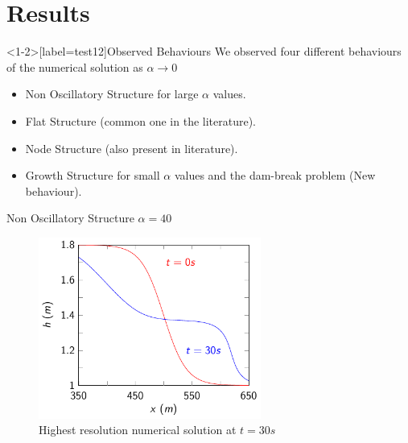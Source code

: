 \documentclass[pdf]{beamer}
\begin{document}
\section{Results}
\begin{frame}<1-2>[label=test12]{Observed Behaviours}
	We observed four different behaviours of the numerical solution as $\alpha \rightarrow 0 $
	\pause
	\begin{itemize}
		\item Non Oscillatory Structure for large $\alpha$ values.
		\pause 
		\item Flat Structure (common one in the literature).
		\pause
		\item Node Structure (also present in literature).	
		\pause	
		\item Growth Structure for small $\alpha$ values and the dam-break problem (New behaviour).
	\end{itemize}
\end{frame}

\begin{frame}{Non Oscillatory Structure $\alpha = 40$}
		\begin{figure}
			\includegraphics[width=0.65\textwidth]{./Pictures/Results/Example/non.pdf}
			\caption{Highest resolution numerical solution at $t=30s$}
		\end{figure}
\end{frame}

\end{document}
